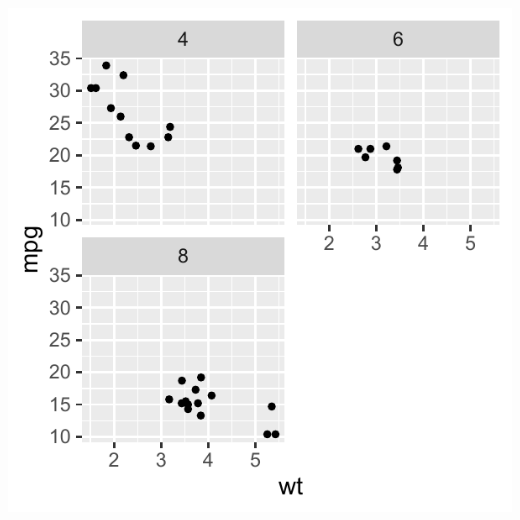 \documentclass[krantz2]{krantz}\usepackage{knitr}
\begin{document}
\begin{knitrout}\footnotesize
{}\color{fgcolor}\begin{kframe}
\begin{alltt}
 \hlopt{+} \hlstd{(} \hlstd{=}   \hlstd{=} \hlstd{)}
\end{alltt}
\end{kframe}

{\centering \includegraphics[width=.495\textwidth]{figure/pos-facets-13-1} 

}


\end{knitrout}
\end{document}
